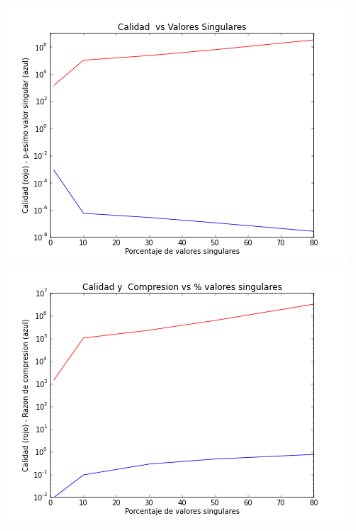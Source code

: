 \documentclass[spanish, fleqn]{article}
\begin{document}
\begin{figure}[htbp]
\begin{minipage}[b]{0.5\linewidth}
			\includegraphics[width=90mm]{./Graficos/matriz3-quality}
			\includegraphics[width=90mm]{./Graficos/matriz3-size}
			\label{fig:figura6}
		\end{minipage}
	\end{figure}
\end{document}
